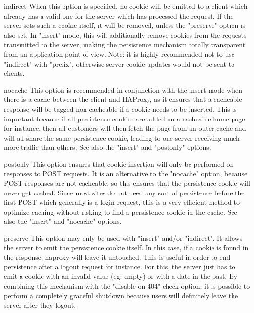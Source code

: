     indirect  When this option is specified, no cookie will be emitted to a
              client which already has a valid one for the server which has
              processed the request. If the server sets such a cookie itself,
              it will be removed, unless the "preserve" option is also set. In
              "insert" mode, this will additionally remove cookies from the
              requests transmitted to the server, making the persistence
              mechanism totally transparent from an application point of view.
              Note: it is highly recommended not to use "indirect" with
              "prefix", otherwise server cookie updates would not be sent to
              clients.

    nocache   This option is recommended in conjunction with the insert mode
              when there is a cache between the client and HAProxy, as it
              ensures that a cacheable response will be tagged non-cacheable if
              a cookie needs to be inserted. This is important because if all
              persistence cookies are added on a cacheable home page for
              instance, then all customers will then fetch the page from an
              outer cache and will all share the same persistence cookie,
              leading to one server receiving much more traffic than others.
              See also the "insert" and "postonly" options.

    postonly  This option ensures that cookie insertion will only be performed
              on responses to POST requests. It is an alternative to the
              "nocache" option, because POST responses are not cacheable, so
              this ensures that the persistence cookie will never get cached.
              Since most sites do not need any sort of persistence before the
              first POST which generally is a login request, this is a very
              efficient method to optimize caching without risking to find a
              persistence cookie in the cache.
              See also the "insert" and "nocache" options.

    preserve  This option may only be used with "insert" and/or "indirect". It
              allows the server to emit the persistence cookie itself. In this
              case, if a cookie is found in the response, haproxy will leave it
              untouched. This is useful in order to end persistence after a
              logout request for instance. For this, the server just has to
              emit a cookie with an invalid value (eg: empty) or with a date in
              the past. By combining this mechanism with the "disable-on-404"
              check option, it is possible to perform a completely graceful
              shutdown because users will definitely leave the server after
              they logout.

